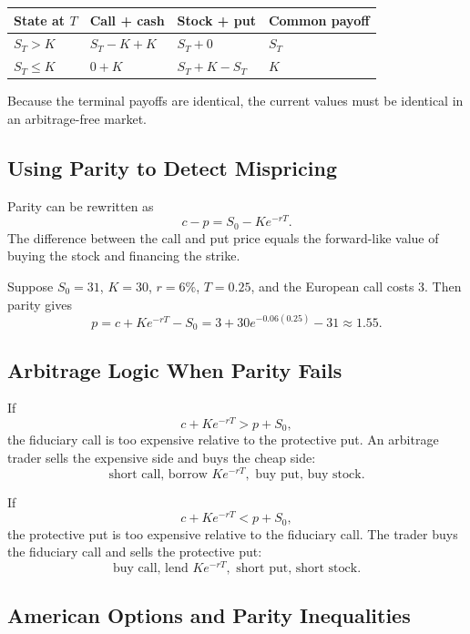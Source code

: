 \begin{center}
\begin{tabular}{llll}
\toprule
State at $T$ & Call + cash & Stock + put & Common payoff \\
\midrule
$S_T>K$ & $S_T-K+K$ & $S_T+0$ & $S_T$ \\
$S_T\leq K$ & $0+K$ & $S_T+K-S_T$ & $K$ \\
\bottomrule
\end{tabular}
\end{center}

Because the terminal payoffs are identical, the current values must be identical
in an arbitrage-free market.

\subsection{Using Parity to Detect Mispricing}

Parity can be rewritten as
\[
    c-p = S_0 - K e^{-rT}.
\]
The difference between the call and put price equals the forward-like value of
buying the stock and financing the strike.

\begin{exmp}
Suppose $S_0=31$, $K=30$, $r=6\%$, $T=0.25$, and the European call costs 3.
Then parity gives
\[
    p = c + K e^{-rT} - S_0
      = 3 + 30e^{-0.06(0.25)} - 31
      \approx 1.55.
\]
\end{exmp}

\subsection{Arbitrage Logic When Parity Fails}

If
\[
    c+K e^{-rT} > p+S_0,
\]
the fiduciary call is too expensive relative to the protective put. An arbitrage
trader sells the expensive side and buys the cheap side:
\[
    \text{short call, borrow } K e^{-rT}, \text{ buy put, buy stock}.
\]

If
\[
    c+K e^{-rT} < p+S_0,
\]
the protective put is too expensive relative to the fiduciary call. The trader
buys the fiduciary call and sells the protective put:
\[
    \text{buy call, lend } K e^{-rT}, \text{ short put, short stock}.
\]

\subsection{American Options and Parity Inequalities}


